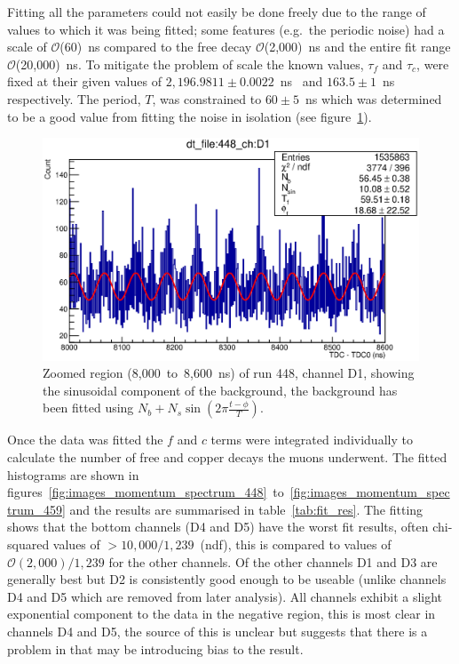 Fitting all the parameters could not easily be done freely due to the range of values to which it was being fitted; some features (e.g.\ the periodic noise) had a scale of \(\mathcal{O}\)(60)~ns compared to the free decay \(\mathcal{O}\)(2,000)~ns and the entire fit range \(\mathcal{O}\)(20,000)~ns. To mitigate the problem of scale the known values, \(\tau_{f}\) and \(\tau_{c}\), were fixed at their given values of \(2,196.9811\pm0.0022 \)~ns~\cite{pdg} and \( 163.5\pm1 \)~ns~\cite{suzuki_mu_capture_rates} respectively. The period, \(T\), was constrained to \(60\pm5\)~ns which was determined to be a good value from fitting the noise in isolation (see figure~\ref{fig:images_momentum_spectrum_448_D1_noise_fit}).

\begin{figure}[hptb]
  \centering
    \includegraphics[width=.9\textwidth]{images/momentum_spectrum/448_D1_noise_fit.eps}
  \caption{Zoomed region (8,000~to~8,600~ns) of run 448, channel D1, showing the sinusoidal component of the background, the background has been fitted using \(N_b + N_s\sin(2\pi\frac{t-\phi}{T})\).}
  \label{fig:images_momentum_spectrum_448_D1_noise_fit}
\end{figure}

Once the data was fitted the \(f\) and \(c\) terms were integrated individually to calculate the number of free and copper decays the muons underwent. The fitted histograms are shown in figures~\ref{fig:images_momentum_spectrum_448}~to~\ref{fig:images_momentum_spectrum_459} and the results are summarised in table~\ref{tab:fit_res}. The fitting shows that the bottom channels (D4 and D5) have the worst fit results, often chi-squared values of \(>10,000 / 1,239\)~(ndf), this is compared to values of \(\mathcal{O}(2,000) / 1,239\) for the other channels. Of the other channels D1 and D3 are generally best but D2 is consistently good enough to be useable (unlike channels D4 and D5 which are removed from later analysis). All channels exhibit a slight exponential component to the data in the negative region, this is most clear in channels D4 and D5, the source of this is unclear but suggests that there is a problem in that may be introducing bias to the result.

